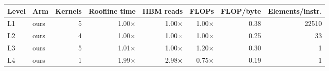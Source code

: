 \begin{tabular}{@{}llrrrrrr@{}}
\toprule
Level & Arm & Kernels & Roofline time & HBM reads & FLOPs & FLOP/byte & Elements/instr. \\
\midrule
L1 & ours & 5 & 1.00$\times$ & 1.00$\times$ & 1.00$\times$ & 0.38 & 22510 \\
L2 & ours & 4 & 1.00$\times$ & 1.00$\times$ & 1.00$\times$ & 0.25 & 33 \\
L3 & ours & 5 & 1.01$\times$ & 1.00$\times$ & 1.20$\times$ & 0.30 & 1 \\
L4 & ours & 1 & 1.99$\times$ & 2.98$\times$ & 0.75$\times$ & 0.19 & 1 \\
\bottomrule
\end{tabular}
